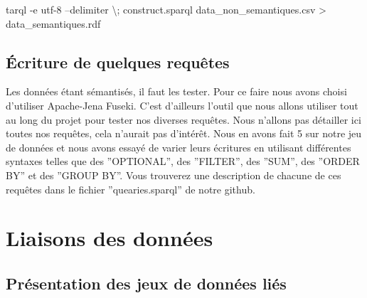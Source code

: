 \documentclass[a4paper,sffamily,12pt]{article}
\begin{document}
			\noindent tarql -e utf-8 --delimiter \textbackslash; construct.sparql data\_non\_semantiques.csv > data\_semantiques.rdf

			\vspace{0.5cm}

		\subsection{Écriture de quelques requêtes }
			
			\vspace{0.5cm}
	
			Les données étant sémantisés, il faut les tester. Pour ce faire nous avons choisi d'utiliser Apache-Jena Fuseki. C'est d'ailleurs l'outil que nous allons utiliser tout au long du projet pour tester nos diverses requêtes. Nous n'allons pas détailler ici toutes nos requêtes, cela n'aurait  pas d'intérêt. Nous en avons fait 5 sur notre jeu de données et nous avons essayé de varier leurs écritures en utilisant différentes syntaxes telles que des ''OPTIONAL'', des ''FILTER'', des ''SUM'', des ''ORDER BY'' et des ''GROUP BY''. Vous trouverez une description de chacune de ces requêtes dans le fichier ''quearies.sparql'' de notre github.

			\vspace{0.5cm}
			
	\section{Liaisons des données}

		\vspace{0.5cm}
			
		\subsection{Présentation des jeux de données liés}
			
			\vspace{0.5cm}			
\end{document}
